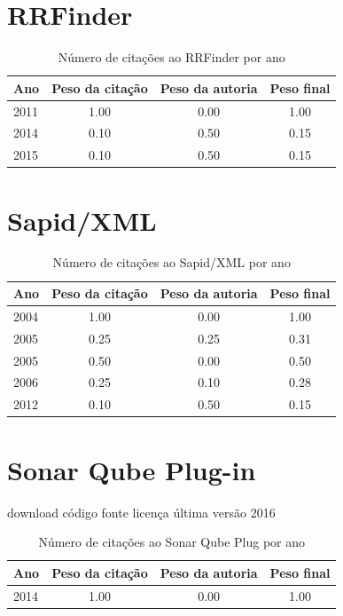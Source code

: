 \section{RRFinder}
\begin{table}[H]
\caption{Número de citações ao RRFinder por ano}
\centering
\begin{tabular}{| l | c | c | c |}
  \hline
  Ano & Peso da citação & Peso da autoria & Peso final \\
  \hline
  2011
    & 1.00
    & 0.00
    & {\color{blue} 1.00} \\
\hline
  2014
    & 0.10
    & 0.50
    & {\color{red} 0.15} \\
\hline
  2015
    & 0.10
    & 0.50
    & {\color{red} 0.15} \\
\hline
\end{tabular}
\end{table}
\section{Sapid/XML}
\begin{table}[H]
\caption{Número de citações ao Sapid/XML por ano}
\centering
\begin{tabular}{| l | c | c | c |}
  \hline
  Ano & Peso da citação & Peso da autoria & Peso final \\
  \hline
  2004
    & 1.00
    & 0.00
    & {\color{blue} 1.00} \\
\hline
  2005
    & 0.25
    & 0.25
    & {\color{red} 0.31} \\
  2005
    & 0.50
    & 0.00
    & {\color{blue} 0.50} \\
\hline
  2006
    & 0.25
    & 0.10
    & {\color{red} 0.28} \\
\hline
  2012
    & 0.10
    & 0.50
    & {\color{red} 0.15} \\
\hline
\end{tabular}
\end{table}
\section{Sonar Qube Plug-in}
\checkmark download
\checkmark código fonte
\checkmark licença
\checkmark última versão 2016
\begin{table}[H]
\caption{Número de citações ao Sonar Qube Plug por ano}
\centering
\begin{tabular}{| l | c | c | c |}
  \hline
  Ano & Peso da citação & Peso da autoria & Peso final \\
  \hline
  2014
    & 1.00
    & 0.00
    & {\color{blue} 1.00} \\
\hline
\end{tabular}
\end{table}
